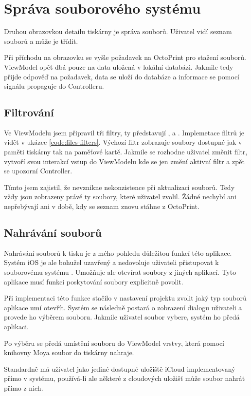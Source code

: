 \section{Správa souborového systému}

Druhou obrazovkou detailu tiskárny je správa souborů.
Uživatel vidí seznam souborů a může je třídit.

Při příchodu na obrazovku se vyšle požadavek na OctoPrint pro stažení souborů.
ViewModel opět dbá pouze na data uložená v lokální databázi.
Jakmile tedy přijde odpověď na požadavek, data se uloží do databáze a informace se pomocí signálu propaguje do Controlleru.

\subsection{Filtrování}

Ve ViewModelu jsem připravil tři filtry, ty představují ,  a .
Implemetace filtrů je vidět v ukázce \ref{code:files-filters}.
Výchozí filtr zobrazuje soubory dostupné jak v paměti tiskárny tak na paměťové kartě.
Jakmile se rozhodne uživatel změnit filtr, vytvoří svou interakcí vstup do ViewModelu kde se jen změní aktivní filtr a zpět se upozorní Controller.


Tímto jsem zajistil, že nevznikne nekonzistence při aktualizaci souborů.
Tedy vždy jsou zobrazeny právě ty soubory, které uživatel zvolil.
Žádné nechybí ani nepřebývají ani v době, kdy se seznam znovu stáhne z OctoPrint.

\subsection{Nahrávání souborů}

Nahrávání souborů k tisku je z mého pohledu důležitou funkcí této aplikace.
Systém iOS je ale bohužel uzavřený a nedovoluje uživateli přistupovat k souborovému systému \cite{imobile-access-fs}.
Umožňuje ale otevírat soubory z jiných aplikací.
Tyto aplikace musí funkci poskytování soubory explicitně povolit.

Při implementaci této funkce stačilo v nastavení projektu zvolit jaký typ souborů aplikace umí otevřít.
Systém se následně postará o zobrazení dialogu uživateli a provede ho výběrem souboru.
Jakmile uživatel soubor vybere, systém ho předá aplikaci.


\bigskip{}

Po výběru se předá umístění souboru do ViewModel vrstvy, která pomocí knihovny Moya soubor do tiskárny nahraje.

Standardně má uživatel jako jediné dostupné uložiště iCloud implementovaný přímo v systému, používá-li ale některé z cloudových uložišť může soubor nahrát přímo z nich.
